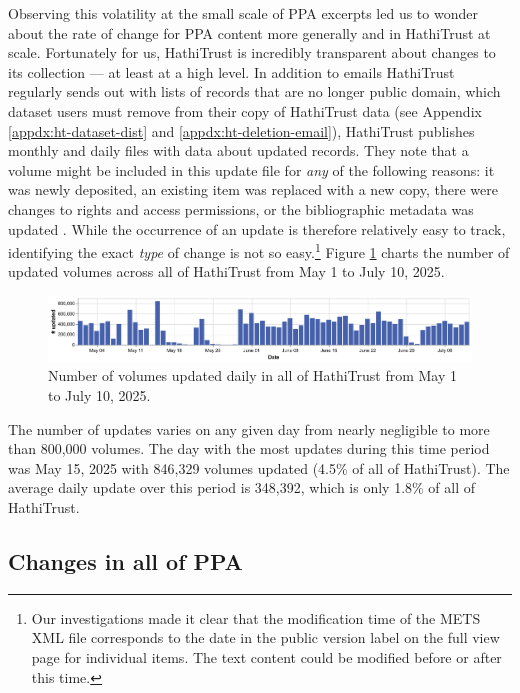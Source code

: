 \documentclass[final]{anthology-ch} %
\begin{document}
Observing this volatility at the small scale of PPA excerpts led us to wonder about the rate of change for PPA content more generally and in HathiTrust at scale. Fortunately for us, HathiTrust is incredibly transparent about changes to its collection — at least at a high level. In addition to emails HathiTrust regularly sends out with lists of records that are no longer public domain, which dataset users must remove from their copy of HathiTrust data (see Appendix \ref{appdx:ht-dataset-dist} and \ref{appdx:ht-deletion-email}), HathiTrust publishes monthly and daily files with data about updated records. They note that a volume might be included in this update file for \textit{any} of the following reasons: it was newly deposited, an existing item was replaced with a new copy, there were changes to rights and access permissions, or the bibliographic metadata was updated \cite{noauthor_hathifiles_nodate}. While the occurrence of an update is therefore relatively easy to track, identifying the exact \textit{type} of change is not so easy.\footnote{Our investigations made it clear that the modification time of the METS XML file corresponds to the date in the public version label on the full view page for individual items. The text content could be modified before or after this time. } Figure \ref{fig:hathi-daily-updates} charts the number of updated volumes across all of HathiTrust from May 1 to July 10, 2025.
\begin{figure}[t!]
    \centering
    \includegraphics[width=1\linewidth]{figures/hathitrust_changes_countonly.pdf}
    \caption{Number of volumes updated daily in all of HathiTrust from May 1 to July 10, 2025.}
    \label{fig:hathi-daily-updates}
\end{figure}
The number of updates varies on any given day from nearly negligible to more than 800,000 volumes. The day with the most updates during this time period was May 15, 2025 with 846,329 volumes updated (4.5\% of all of HathiTrust). The average daily update over this period is 348,392, which is only 1.8\% of all of HathiTrust.

\subsection{Changes in all of PPA}
\end{document}
